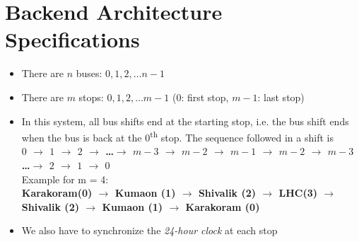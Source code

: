 \section{Backend Architecture Specifications}

\begin{itemize}
    \item There are $n$ buses: $0, 1, 2, \ldots n-1$
    \item There are $m$ stops: $0, 1, 2, \ldots m-1$  ($0$: first stop, $m-1$: last stop)
    \item In this system, all bus shifts end at the starting stop, i.e. the bus shift ends when the bus is back at the $0$\textsuperscript{th} stop. The sequence followed in a shift is \\
          {\bfseries $0$ $\to$ $1$ $\to$ $2$ $\to$ \ldots $\to$ $m-3$ $\to$ $m-2$ $\to$ $m-1$ $\to$ $m-2$ $\to$ $m-3$ \ldots$\to$ $2$ $\to$ $1$ $\to$ $0$}\\
          Example for m = 4: \\
          {\bfseries Karakoram(0) $\to$ Kumaon (1) $\to$ Shivalik (2) $\to$ \ac{LHC}(3) $\to$ Shivalik (2) $\to$ Kumaon (1) $\to$ Karakoram (0)}
    \item We also have to synchronize the \textit{\gls{24-hour clock}} at each stop
\end{itemize}


